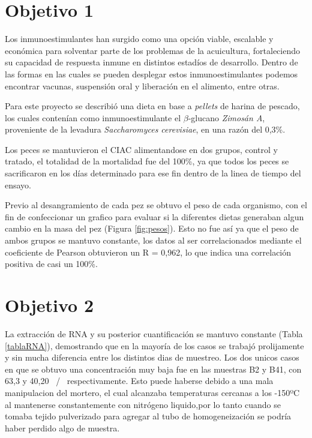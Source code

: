 \documentclass[12pt,letterpaper,oneside]{scrbook}
\begin{document}
\section{Objetivo 1}

Los inmunoestimulantes han surgido como una opción viable, escalable y
económica para solventar parte de los problemas de la acuicultura,
fortaleciendo su capacidad de respuesta inmune en distintos estadíos de
desarrollo. Dentro de las formas en las cuales se pueden desplegar estos
inmunoestimulantes podemos encontrar vacunas, suspensión oral y
liberación en el alimento, entre otras.

Para este proyecto se describió una dieta en base a \emph{pellets} de
harina de pescado, los cuales contenían como inmunoestimulante el
\(\beta\)-glucano \emph{Zimosán A}, proveniente de la levadura
\emph{Saccharomyces cerevisiae}, en una razón del 0,3\%.

Los peces se mantuvieron el CIAC alimentandose en dos grupos, control y
tratado, el totalidad de la mortalidad fue del 100\%, ya que todos los
peces se sacrificaron en los días determinado para ese fin dentro de la
linea de tiempo del ensayo.

Previo al desangramiento de cada pez se obtuvo el peso de cada
organismo, con el fin de confeccionar un grafico para evaluar si la
diferentes dietas generaban algun cambio en la masa del pez (Figura
\ref{fig:pesos}). Esto no fue así ya que el peso de ambos grupos se
mantuvo constante, los datos al ser correlacionados mediante el
coeficiente de Pearson obtuvieron un R = 0,962, lo que indica una
correlación positiva de casi un 100\%.

\section{Objetivo 2}

La extracción de RNA y su posterior cuantificación se mantuvo constante
(Tabla \ref{tablaRNA}), demostrando que en la mayoría de los casos se
trabajó prolijamente y sin mucha diferencia entre los distintos dias de
muestreo. Los dos unicos casos en que se obtuvo una concentración muy
baja fue en las muestras B2 y B41, con 63,3 y 40,20
\si{\nano\gramo}/\si{\micro\litro} respectivamente. Esto puede haberse
debido a una mala manipulacion del mortero, el cual alcanzaba
temperaturas cercanas a los -150ºC al mantenerse constantemente con
nitrógeno liquido,por lo tanto cuando se tomaba tejido pulverizado para
agregar al tubo de homogeneización se podría haber perdido algo de
muestra.
\end{document}
